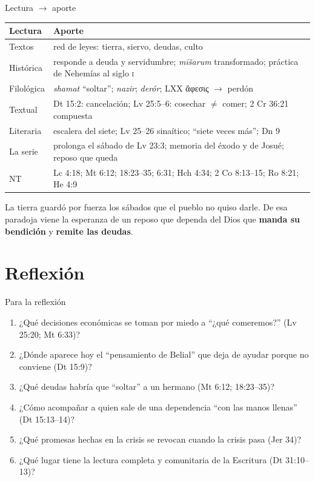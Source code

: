 \documentclass[hyperref={bookmarks=false},aspectratio=169]{beamer}
\newcommand{\grc}[1]{\foreignlanguage{ancientgreek}{#1}}
\newcommand{\destacar}[1]{\textbf{\textcolor{tierraroja}{#1}}}
\begin{document}
\begin{frame}{Lectura $\rightarrow$ aporte}
\scriptsize\renewcommand{\arraystretch}{1.15}
\begin{tabular}{@{}L{2.3cm}L{9.7cm}@{}}
\toprule
\textbf{Lectura} & \textbf{Aporte} \\ \midrule
Textos & red de leyes: tierra, siervo, deudas, culto \\
Histórica & responde a deuda y servidumbre; \emph{mīšarum} transformado; práctica de Nehemías al siglo \textsc{i} \\
Filológica & \emph{shamat} ``soltar''; \emph{nazir}; \emph{derór}; LXX \grc{ἄφεσις} $\rightarrow$ perdón \\
Textual & Dt 15:2: cancelación; Lv 25:5--6: cosechar $\neq$ comer; 2 Cr 36:21 compuesta \\
Literaria & escalera del siete; Lv 25--26 sinaítico; ``siete veces más''; Dn 9 \\
La serie & prolonga el sábado de Lv 23:3; memoria del éxodo y de Josué; reposo que queda \\
NT & Lc 4:18; Mt 6:12; 18:23--35; 6:31; Hch 4:34; 2 Co 8:13--15; Ro 8:21; He 4:9 \\
\bottomrule
\end{tabular}\par\medskip
\small\RaggedRight La tierra guardó por fuerza los sábados que el pueblo no quiso darle. De esa paradoja viene la esperanza de un reposo que dependa del Dios que \destacar{manda su bendición} y \destacar{remite las deudas}.
\end{frame}

\section{Reflexión}

\begin{frame}{Para la reflexión}
\small
\begin{enumerate}
\item ¿Qué decisiones económicas se toman por miedo a ``¿qué comeremos?'' (Lv 25:20; Mt 6:33)?
\item ¿Dónde aparece hoy el ``pensamiento de Belial'' que deja de ayudar porque no conviene (Dt 15:9)?
\item ¿Qué deudas habría que ``soltar'' a un hermano (Mt 6:12; 18:23--35)?
\item ¿Cómo acompañar a quien sale de una dependencia ``con las manos llenas'' (Dt 15:13--14)?
\item ¿Qué promesas hechas en la crisis se revocan cuando la crisis pasa (Jer 34)?
\item ¿Qué lugar tiene la lectura completa y comunitaria de la Escritura (Dt 31:10--13)?
\end{enumerate}
\end{frame}
\end{document}
